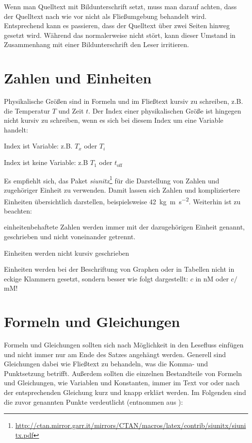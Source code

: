 Wenn man Quelltext mit Bildunterschrift setzt, muss man darauf achten, dass der Quelltext nach wie vor nicht als Fließumgebung behandelt wird. Entsprechend kann es passieren, dass der Quelltext über zwei Seiten hinweg gesetzt wird. Während das normalerweise nicht stört, kann dieser Umstand in Zusammenhang mit einer Bildunterschrift den Leser irritieren.

\section{Zahlen und Einheiten}

Physikalische Größen sind in Formeln und im Fließtext kursiv zu schreiben, z.B. die Temperatur $T$ und Zeit $t$. Der Index einer physikalischen Größe ist hingegen nicht kursiv zu schreiben, wenn es sich bei diesem Index um eine Variable handelt:

\begin{compactitem}
	\item Index ist Variable: z.B. $T_x$ oder $T_i$
	\item Index ist keine Variable: z.B $T_{\textrm{1}}$ oder $t_{\textrm{off}}$
\end{compactitem}

Es empfiehlt sich, das Paket \textit{siunitx}\footnote{\url{http://ctan.mirror.garr.it/mirrors/CTAN/macros/latex/contrib/siunitx/siunitx.pdf}} für die Darstellung von Zahlen und zugehöriger Einheit zu verwenden. Damit lassen sich Zahlen und kompliziertere Einheiten übersichtlich darstellen, beispielsweise \SI{42}{\kilo\gram\metre\per\square\second}. Weiterhin ist zu beachten:

\begin{compactitem}
	\item einheitenbehaftete Zahlen werden immer mit der dazugehörigen Einheit genannt, geschrieben und nicht voneinander getrennt.
	\item Einheiten werden nicht kursiv geschrieben
	\item Einheiten werden bei der Beschriftung von Graphen oder in Tabellen nicht in eckige Klammern gesetzt, sondern besser wie folgt dargestellt: $c$ in nM oder $c /$mM!
\end{compactitem}

\section{Formeln und Gleichungen}

Formeln und Gleichungen sollten sich nach Möglichkeit in den Lesefluss einfügen und nicht immer nur am Ende des Satzes angehängt werden. Generell sind Gleichungen dabei wie Fließtext zu behandeln, was die Komma- und Punktsetzung betrifft. Außerdem sollten die einzelnen Bestandteile von Formeln und Gleichungen, wie Variablen und Konstanten, immer im Text vor oder nach der entsprechenden Gleichung kurz und knapp erklärt werden. Im Folgenden sind die zuvor genannten Punkte verdeutlicht (entnommen aus \cite{MA_Kappel}):


